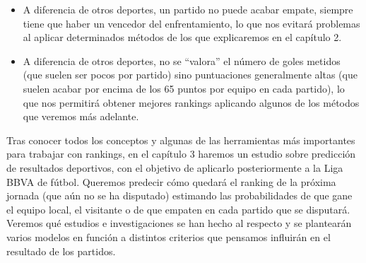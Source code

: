 \begin{itemize}
	\item A diferencia de otros deportes, un partido no puede acabar empate, siempre tiene que haber un vencedor del enfrentamiento, lo que nos evitará problemas al aplicar determinados métodos de los que explicaremos en el capítulo 2. 
	\item A diferencia de otros deportes, no se ``valora'' el número de goles metidos (que suelen ser pocos por partido) sino puntuaciones generalmente altas (que suelen acabar por encima de los 65 puntos por equipo en cada partido), lo que nos permitirá obtener mejores rankings aplicando algunos de los métodos que veremos más adelante. 
\end{itemize}

Tras conocer todos los conceptos y algunas de las herramientas más importantes para trabajar con rankings, en el capítulo 3 haremos un estudio sobre predicción de resultados deportivos, con el objetivo de aplicarlo posteriormente a la Liga BBVA de fútbol. Queremos predecir cómo quedará el ranking de la próxima jornada (que aún no se ha disputado) estimando las probabilidades de que gane el equipo local, el visitante o de que empaten en cada partido que se disputará. Veremos qué estudios e investigaciones se han hecho al respecto y se plantearán varios modelos en función a distintos criterios que pensamos influirán en el resultado de los partidos.